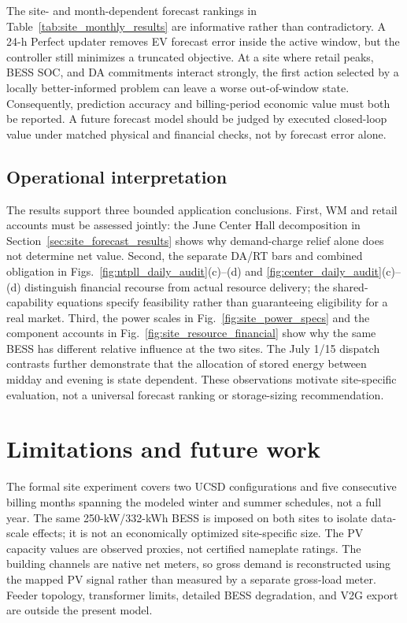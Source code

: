 \documentclass[final,5p,times]{elsarticle}
\begin{document}
The site- and month-dependent forecast rankings in Table~\ref{tab:site_monthly_results} are informative rather than contradictory. A 24-h Perfect updater removes EV forecast error inside the
active window, but the controller still minimizes a truncated objective. At a
site where retail peaks, BESS SOC, and DA commitments interact strongly, the
first action selected by a locally better-informed problem can leave a worse
out-of-window state. Consequently, prediction accuracy and billing-period
economic value must both be reported. A future forecast model should be judged
by executed closed-loop value under matched physical and financial checks, not
by forecast error alone.

\subsection{Operational interpretation}

The results support three bounded application conclusions. First, WM and
retail accounts must be assessed jointly: the June Center Hall decomposition
in Section~\ref{sec:site_forecast_results} shows why demand-charge relief alone
does not determine net value. Second, the separate DA/RT bars and combined
obligation in Figs.~\ref{fig:ntpll_daily_audit}(c)--(d) and
\ref{fig:center_daily_audit}(c)--(d) distinguish financial recourse from actual
resource delivery; the shared-capability equations specify feasibility rather
than guaranteeing eligibility for a real market. Third, the power scales in
Fig.~\ref{fig:site_power_specs} and the component accounts in
Fig.~\ref{fig:site_resource_financial} show why the same BESS has different
relative influence at the two sites. The July 1/15 dispatch contrasts further
demonstrate that the allocation of stored energy between midday and evening
is state dependent. These observations motivate site-specific evaluation, not
a universal forecast ranking or storage-sizing recommendation.

\section{Limitations and future work}
\label{sec:limitations}

The formal site experiment covers two UCSD configurations and five consecutive
billing months spanning the modeled winter and summer schedules, not a full year. The same 250-kW/332-kWh BESS is imposed on both sites to isolate
data-scale effects; it is not an economically optimized site-specific size.
The PV capacity values are observed proxies, not certified nameplate ratings.
The building channels are native net meters, so gross demand is reconstructed
using the mapped PV signal rather than measured by a separate gross-load meter.
Feeder topology, transformer limits, detailed BESS degradation, and V2G export
are outside the present model.
\end{document}
